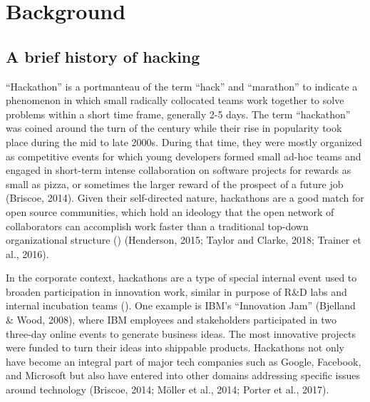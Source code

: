 \documentclass{hcij}
\begin{document}
\section{Background}
\subsection{A brief history of hacking}
“Hackathon” is a portmanteau of the term “hack” and “marathon” to indicate a phenomenon in which small radically collocated teams work together to solve problems within a short time frame, generally 2-5 days. The term “hackathon” was coined around the turn of the century while their rise in popularity took place during the mid to late 2000s. During that time, they were mostly organized as competitive events for which young developers formed small ad-hoc teams and engaged in short-term intense collaboration on software projects for rewards as small as pizza, or sometimes the larger reward of the prospect of a future job (Briscoe, 2014). Given their self-directed nature, hackathons are a good match for open source communities, which hold an ideology that the open network of collaborators can accomplish work faster than a traditional top-down organizational structure (\cite{bailey2010s}) (Henderson, 2015; Taylor and Clarke, 2018; Trainer et al., 2016).

In the corporate context, hackathons are a type of special internal event used to broaden participation in innovation work, similar in purpose of R&D labs and internal incubation teams (\cite{bailey2010s}). One example is IBM’s “Innovation Jam” (Bjelland & Wood, 2008), where IBM employees and stakeholders participated in two three-day online events to generate business ideas. The most innovative projects were funded to turn their ideas into shippable products. Hackathons not only have become an integral part of major tech companies such as Google, Facebook, and Microsoft but also have entered into other domains addressing specific issues around technology (Briscoe, 2014; Möller et al., 2014; Porter et al., 2017).
\end{document}
